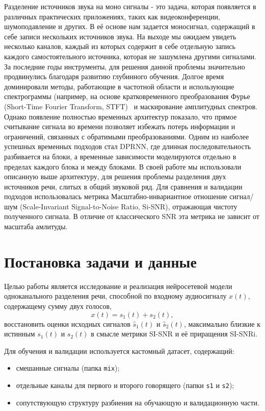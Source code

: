 \documentclass[10pt,conference,compsocconf]{IEEEtran}
\begin{document}
Разделение источников звука на моно сигналы - это задача, которая появляется в различных практических приложениях, таких как видеоконференции, шумоподавление и других. В её основе нам задается моносигнал, содержащий в себе записи нескольких источников звука. На выходе мы ожидаем увидеть несколько каналов, каждый из которых содержит в себе отдельную запись каждого самостоятельного источника, которая не зашумлена другими сигналами. За последние годы инструменты, для решения данной проблемы значительно продвинулись благодаря развитию глубинного обучения. 
Долгое время доминировали методы, работающие в частотной области и использующие спектрограммы (например, на основе кратковременного преобразования Фурье (Short-Time Fourier Transform, STFT)~\cite{allen_stft} и маскирование амплитудных спектров. Однако появление полностью временных архитектур показало, что прямое считывание сигнала во времени позволяет избежать потерь информации и ограничений, связанных с обратимыми преобразованиями. Одним из наиболее успешных временных подходов стал DPRNN, где длинная последовательность разбивается на блоки, а временные зависимости моделируются отдельно в пределах каждого блока и между блоками. В своей работе мы использовали описанную выше архитектуру, для решения проблемы разделения двух источников речи, слитых в общий звуковой ряд. 
	Для сравнения и валидации подходов использовалась метрика Масштабно-инвариантное отношение сигнал/шум (Scale-Invariant Signal-to-Noise Ratio, Si-SNR), отражающая чистоту полученного сигнала. В отличие от классического SNR эта метрика не зависит от масштаба амлитуды. 
\section{Постановка задачи и данные}

Целью работы является исследование и реализация нейросетевой модели
одно\-канального разделения речи, способной по входному аудиосигналу
$x(t)$, содержащему сумму двух голосов,
\[
x(t) = s_1(t) + s_2(t),
\]
восстановить оценки исходных сигналов $\hat{s}_1(t)$ и $\hat{s}_2(t)$,
максимально близкие к истинным $s_1(t)$ и $s_2(t)$ в смысле метрики
SI-SNR и её приращения SI-SNRi.

Для обучения и валидации используется кастомный датасет, содержащий:
\begin{itemize}
  \item смешанные сигналы (папка \texttt{mix});
  \item отдельные каналы для первого и второго говорящего (папки \texttt{s1} и \texttt{s2});
  \item сопутствующую структуру разбиения на обучающую и валидационную части.
\end{itemize}
\end{document}
